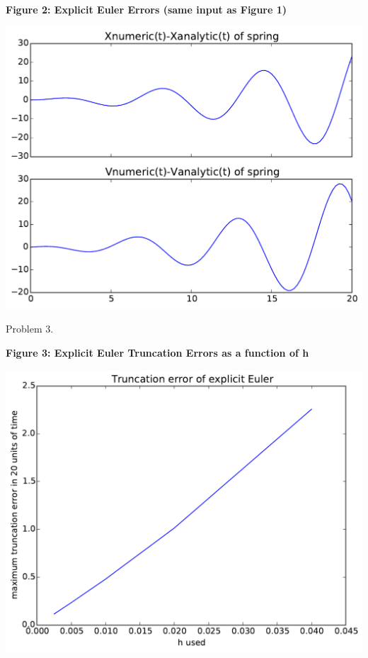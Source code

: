 \documentclass{article}
\begin{document}
\clearpage

\begin{center}
    \textbf{Figure 2: Explicit Euler Errors (same input as Figure 1)}\par\medskip
    \includegraphics[scale=1.0]{explicitEulerErrors1}
\end{center}


Problem 3.

\begin{center}
    \textbf{Figure 3: Explicit Euler Truncation Errors as a function of h}\par\medskip
    \includegraphics[scale=1.0]{eE_truncation}
\end{center}
\end{document}
